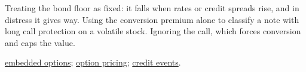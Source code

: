 \begin{qfmethod}
 Treating the bond floor as fixed: it falls when rates or credit spreads rise, and in distress it gives way. Using the conversion premium alone to classify a note with long call protection on a volatile stock. Ignoring the call, which forces conversion and caps the value.

 \hyperref[meth:callable-putable-bond-valuation]{embedded options}; \hyperref[mod:black-scholes-merton]{option pricing}; \hyperref[mech:cds-contract-credit-events]{credit events}.

\end{qfmethod}
